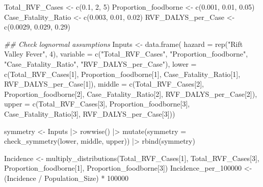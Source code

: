 \documentclass[
  letterpaper,
  DIV=11,
  numbers=noendperiod]{scrartcl}
\newenvironment{Shaded}{\begin{snugshade}}{\end{snugshade}}
\newcommand{\AttributeTok}[1]{\textcolor[rgb]{0.40,0.45,0.13}{#1}}
\newcommand{\DecValTok}[1]{\textcolor[rgb]{0.68,0.00,0.00}{#1}}
\newcommand{\DocumentationTok}[1]{\textcolor[rgb]{0.37,0.37,0.37}{\textit{#1}}}
\newcommand{\FloatTok}[1]{\textcolor[rgb]{0.68,0.00,0.00}{#1}}
\newcommand{\FunctionTok}[1]{\textcolor[rgb]{0.28,0.35,0.67}{#1}}
\newcommand{\NormalTok}[1]{\textcolor[rgb]{0.00,0.23,0.31}{#1}}
\newcommand{\OtherTok}[1]{\textcolor[rgb]{0.00,0.23,0.31}{#1}}
\newcommand{\SpecialCharTok}[1]{\textcolor[rgb]{0.37,0.37,0.37}{#1}}
\newcommand{\StringTok}[1]{\textcolor[rgb]{0.13,0.47,0.30}{#1}}
\begin{document}
\begin{Shaded}
\begin{Highlighting}[]
\NormalTok{Total\_RVF\_Cases }\OtherTok{\textless{}{-}} \FunctionTok{c}\NormalTok{(}\FloatTok{0.1}\NormalTok{, }\DecValTok{2}\NormalTok{, }\DecValTok{5}\NormalTok{)}
\NormalTok{Proportion\_foodborne }\OtherTok{\textless{}{-}} \FunctionTok{c}\NormalTok{(}\FloatTok{0.001}\NormalTok{, }\FloatTok{0.01}\NormalTok{, }\FloatTok{0.05}\NormalTok{)}
\NormalTok{Case\_Fatality\_Ratio }\OtherTok{\textless{}{-}} \FunctionTok{c}\NormalTok{(}\FloatTok{0.003}\NormalTok{, }\FloatTok{0.01}\NormalTok{, }\FloatTok{0.02}\NormalTok{)}
\NormalTok{RVF\_DALYS\_per\_Case }\OtherTok{\textless{}{-}} \FunctionTok{c}\NormalTok{(}\FloatTok{0.0029}\NormalTok{,  }\FloatTok{0.029}\NormalTok{,  }\FloatTok{0.29}\NormalTok{)}

\DocumentationTok{\#\# Check lognormal assumptions}
\NormalTok{Inputs }\OtherTok{\textless{}{-}} \FunctionTok{data.frame}\NormalTok{(}
 \AttributeTok{hazard =} \FunctionTok{rep}\NormalTok{(}\StringTok{"Rift Valley Fever"}\NormalTok{,  }\DecValTok{4}\NormalTok{), }
 \AttributeTok{variable =} \FunctionTok{c}\NormalTok{(}\StringTok{"Total\_RVF\_Cases"}\NormalTok{,  }\StringTok{"Proportion\_foodborne"}\NormalTok{,  }\StringTok{"Case\_Fatality\_Ratio"}\NormalTok{,  }\StringTok{"RVF\_DALYS\_per\_Case"}\NormalTok{), }
 \AttributeTok{lower =} \FunctionTok{c}\NormalTok{(Total\_RVF\_Cases[}\DecValTok{1}\NormalTok{],  Proportion\_foodborne[}\DecValTok{1}\NormalTok{],  Case\_Fatality\_Ratio[}\DecValTok{1}\NormalTok{],  RVF\_DALYS\_per\_Case[}\DecValTok{1}\NormalTok{]), }
 \AttributeTok{middle =} \FunctionTok{c}\NormalTok{(Total\_RVF\_Cases[}\DecValTok{2}\NormalTok{],  Proportion\_foodborne[}\DecValTok{2}\NormalTok{],  Case\_Fatality\_Ratio[}\DecValTok{2}\NormalTok{],  RVF\_DALYS\_per\_Case[}\DecValTok{2}\NormalTok{]), }
 \AttributeTok{upper =} \FunctionTok{c}\NormalTok{(Total\_RVF\_Cases[}\DecValTok{3}\NormalTok{],  Proportion\_foodborne[}\DecValTok{3}\NormalTok{],  Case\_Fatality\_Ratio[}\DecValTok{3}\NormalTok{],  RVF\_DALYS\_per\_Case[}\DecValTok{3}\NormalTok{]))}

\NormalTok{symmetry }\OtherTok{\textless{}{-}}\NormalTok{ Inputs }\SpecialCharTok{|\textgreater{}}
 \FunctionTok{rowwise}\NormalTok{() }\SpecialCharTok{|\textgreater{}}
 \FunctionTok{mutate}\NormalTok{(}\AttributeTok{symmetry =} \FunctionTok{check\_symmetry}\NormalTok{(lower,  middle,  upper)) }\SpecialCharTok{|\textgreater{}}
 \FunctionTok{rbind}\NormalTok{(symmetry)}

\NormalTok{Incidence }\OtherTok{\textless{}{-}} \FunctionTok{multiply\_distributions}\NormalTok{(Total\_RVF\_Cases[}\DecValTok{1}\NormalTok{], Total\_RVF\_Cases[}\DecValTok{3}\NormalTok{],  Proportion\_foodborne[}\DecValTok{1}\NormalTok{],  Proportion\_foodborne[}\DecValTok{3}\NormalTok{])}
\NormalTok{Incidence\_per\_100000 }\OtherTok{\textless{}{-}}\NormalTok{ (Incidence }\SpecialCharTok{/}\NormalTok{ Population\_Size) }\SpecialCharTok{*} \DecValTok{100000}



\end{Highlighting}
\end{Shaded}
\end{document}
